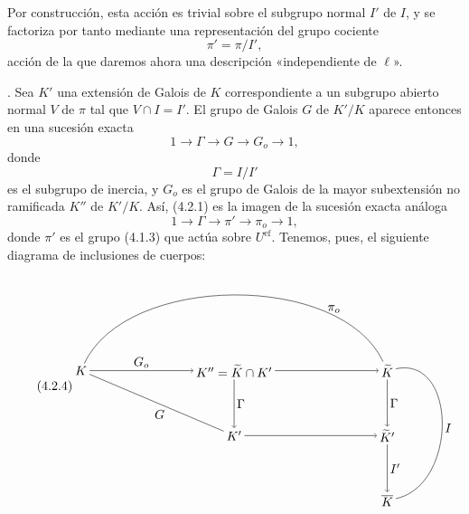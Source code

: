 Por construcción, esta acción es trivial sobre el subgrupo normal $I'$
de $I$, y se factoriza por tanto mediante una representación del grupo
cociente
\begin{equation}\tag{4.1.3}
 \pi'=\pi/I',
\end{equation}
acción de la que daremos ahora una descripción «independiente de
$\ell$».

\medskip
{}. Sea $K'$ una extensión de Galois de $K$ correspondiente a un
subgrupo abierto normal $V$ de $\pi$ tal que $V\cap I=I'$. El grupo de
Galois $G$ de $K'/K$ aparece entonces en una sucesión exacta
\begin{equation}\tag{4.2.1}
 1\longrightarrow\Gamma\longrightarrow G\longrightarrow G_o
 \longrightarrow1,
\end{equation}
donde
\begin{equation}\tag{4.2.2}
 \Gamma=I/I'
\end{equation}
es el subgrupo de inercia, y $G_o$ es el grupo de Galois de la mayor
subextensión no ramificada $K''$ de $K'/K$. Así, (4.2.1) es la imagen
de la sucesión exacta análoga
\begin{equation}\tag{4.2.3}
 1\longrightarrow\Gamma\longrightarrow\pi'\longrightarrow\pi_o
 \longrightarrow1,
\end{equation}
donde $\pi'$ es el grupo (4.1.3) que actúa sobre $U^{\mathrm{ef}}$.
Tenemos, pues, el siguiente diagrama de inclusiones de cuerpos:
\begin{equation}\tag{4.2.4}
\begin{tikzpicture}[baseline=(current bounding box.center),
  every node/.style={inner sep=2pt}]
  \node (K) at (0,0) {$K$};
  \node (Ktwo) at (4.25,0) {$K''=\widetilde K\cap K'$};
  \node (Kt) at (8.5,0) {$\widetilde K$};
  \node (Kp) at (4.25,-1.8) {$K'$};
  \node (Ktp) at (8.5,-1.8) {$\widetilde K'$};
  \node (Kb) at (8.5,-3.6) {$\overline K$};
  \draw[->] (K) -- node[above] {$G_o$} (Ktwo);
  \draw[->] (Ktwo) -- (Kt);
  \draw[->] (Ktwo) -- node[right] {$\Gamma$} (Kp);
  \draw[->] (Kp) -- (Ktp);
  \draw[->] (Kt) -- node[right] {$\Gamma$} (Ktp);
  \draw[->] (Ktp) -- node[right] {$I'$} (Kb);
  \draw[-] (K) -- node[below left,pos=.58] {$G$} (Kp);
  \draw[-] (K) to[out=65,in=115,looseness=.85]
    node[above,pos=.78] {$\pi_o$} (Kt);
  \draw[-] (Kt) to[out=12,in=12,looseness=1.25]
    node[right,pos=.52] {$I$} (Kb);
\end{tikzpicture}
\end{equation}

